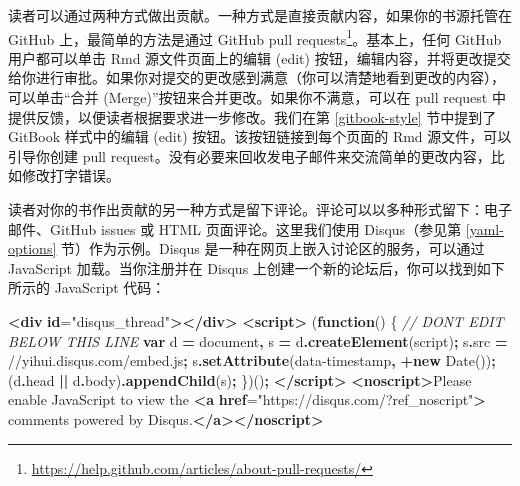 \documentclass[
  12pt,
]{krantz}
\newenvironment{Shaded}{\begin{snugshade}}{\end{snugshade}}
\newcommand{\AttributeTok}[1]{\textcolor[rgb]{0.13,0.29,0.53}{#1}}
\newcommand{\BuiltInTok}[1]{#1}
\newcommand{\CommentTok}[1]{\textcolor[rgb]{0.56,0.35,0.01}{\textit{#1}}}
\newcommand{\ErrorTok}[1]{\textcolor[rgb]{0.64,0.00,0.00}{\textbf{#1}}}
\newcommand{\FunctionTok}[1]{\textcolor[rgb]{0.13,0.29,0.53}{\textbf{#1}}}
\newcommand{\KeywordTok}[1]{\textcolor[rgb]{0.13,0.29,0.53}{\textbf{#1}}}
\newcommand{\NormalTok}[1]{#1}
\newcommand{\OperatorTok}[1]{\textcolor[rgb]{0.81,0.36,0.00}{\textbf{#1}}}
\newcommand{\OtherTok}[1]{\textcolor[rgb]{0.56,0.35,0.01}{#1}}
\newcommand{\StringTok}[1]{\textcolor[rgb]{0.31,0.60,0.02}{#1}}
\renewcommand{\href}[2]{#2\footnote{\url{#1}}}
\theoremstyle{definition}
\theoremstyle{definition}
\theoremstyle{definition}
\theoremstyle{definition}
\theoremstyle{remark}
\begin{document}
读者可以通过两种方式做出贡献。一种方式是直接贡献内容，如果你的书源托管在 GitHub 上，最简单的方法是通过 \href{https://help.github.com/articles/about-pull-requests/}{GitHub pull requests}。基本上，任何 GitHub 用户都可以单击 Rmd 源文件页面上的编辑 (edit) 按钮，编辑内容，并将更改提交给你进行审批。如果你对提交的更改感到满意（你可以清楚地看到更改的内容），可以单击``合并 (Merge)''按钮来合并更改。如果你不满意，可以在 pull request 中提供反馈，以便读者根据要求进一步修改。我们在第 \ref{gitbook-style} 节中提到了 GitBook 样式中的编辑 (edit) 按钮。该按钮链接到每个页面的 Rmd 源文件，可以引导你创建 pull request。没有必要来回收发电子邮件来交流简单的更改内容，比如修改打字错误。

读者对你的书作出贡献的另一种方式是留下评论。评论可以以多种形式留下：电子邮件、GitHub issues 或 HTML 页面评论。这里我们使用 Disqus（参见第 \ref{yaml-options} 节）作为示例。Disqus 是一种在网页上嵌入讨论区的服务，可以通过 JavaScript 加载。当你注册并在 Disqus 上创建一个新的论坛后，你可以找到如下所示的 JavaScript 代码：

\begin{Shaded}
\begin{Highlighting}[]
\KeywordTok{\textless{}div} \ErrorTok{id}\OtherTok{=}\StringTok{"disqus\_thread"}\KeywordTok{\textgreater{}\textless{}/div\textgreater{}}
\KeywordTok{\textless{}script\textgreater{}}
\NormalTok{(}\KeywordTok{function}\NormalTok{() \{ }\CommentTok{// DON\textquotesingle{}T EDIT BELOW THIS LINE}
\KeywordTok{var}\NormalTok{ d }\OperatorTok{=} \BuiltInTok{document}\OperatorTok{,}\NormalTok{ s }\OperatorTok{=}\NormalTok{ d}\OperatorTok{.}\FunctionTok{createElement}\NormalTok{(}\StringTok{\textquotesingle{}script\textquotesingle{}}\NormalTok{)}\OperatorTok{;}
\NormalTok{s}\OperatorTok{.}\AttributeTok{src} \OperatorTok{=} \StringTok{\textquotesingle{}//yihui.disqus.com/embed.js\textquotesingle{}}\OperatorTok{;}
\NormalTok{s}\OperatorTok{.}\FunctionTok{setAttribute}\NormalTok{(}\StringTok{\textquotesingle{}data{-}timestamp\textquotesingle{}}\OperatorTok{,} \OperatorTok{+}\KeywordTok{new} \BuiltInTok{Date}\NormalTok{())}\OperatorTok{;}
\NormalTok{(d}\OperatorTok{.}\AttributeTok{head} \OperatorTok{||}\NormalTok{ d}\OperatorTok{.}\AttributeTok{body}\NormalTok{)}\OperatorTok{.}\FunctionTok{appendChild}\NormalTok{(s)}\OperatorTok{;}
\NormalTok{\})()}\OperatorTok{;}
\KeywordTok{\textless{}/script\textgreater{}}
\KeywordTok{\textless{}noscript\textgreater{}}\NormalTok{Please enable JavaScript to view the}
\KeywordTok{\textless{}a} \ErrorTok{href}\OtherTok{=}\StringTok{"https://disqus.com/?ref\_noscript"}\KeywordTok{\textgreater{}}
\NormalTok{  comments powered by Disqus.}\KeywordTok{\textless{}/a\textgreater{}\textless{}/noscript\textgreater{}}
\end{Highlighting}
\end{Shaded}
\end{document}
